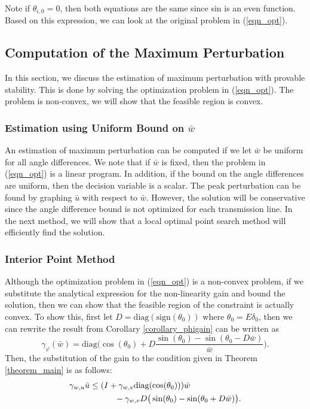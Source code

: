 \documentclass[journal]{IEEEtran}
\theoremstyle{definition}
\begin{document}
Note if $\theta_{i,0}=0$, then both equations are the same since sin is an even function. Based on this expression, we can look at the original problem in (\ref{eqn_opt}).

\subsection{Computation of the Maximum Perturbation}
In this section, we discuss the estimation of maximum perturbation with provable stability. This is done by solving the optimization problem in (\ref{eqn_opt}). The problem is non-convex, we will show that the feasible region is convex.


\subsubsection{Estimation using Uniform Bound on $\bar{w}$}
An estimation of maximum perturbation can be computed if we let $\bar{w}$ be uniform for all angle differences. We note that if $\bar{w}$ is fixed, then the problem in (\ref{eqn_opt}) is a linear program. In addition, if the bound on the angle differences are uniform, then the decision variable is a scalar. The peak perturbation can be found by graphing $\bar{u}$ with respect to $\bar{w}$. However, the solution will be conservative since the angle difference bound is not optimized for each transmission line. In the next method, we will show that a local optimal point search method will efficiently find the solution.

\subsubsection{Interior Point Method}
Although the optimization problem in (\ref{eqn_opt}) is a non-convex problem, if we substitute the analytical expression for the non-linearity gain and bound the solution, then we can show that the feasible region of the constraint is actually convex.
To show this, first let $D=\text{diag}(\text{sign}(\theta_0))$ where $\theta_0=E\delta_0$, then we can rewrite the result from Corollary \ref{corollary_phigain} can be written as
\begin{equation}
\gamma_\varphi(\bar{w})=\text{diag}\bigg(\cos(\theta_0)+D\frac{\sin(\theta_0)-\sin(\theta_0-D\bar{w})}{\bar{w}}\bigg).
\end{equation}
Then, the substitution of the gain to the condition given in Theorem \ref{theorem_main} is as follows:
\begin{equation}
\begin{aligned}
\gamma_{w,u}\bar{u}&\leq(I+\gamma_{w,v}\text{diag}(\cos(\theta_0)))\bar{w} \\
& \hskip 3em -\gamma_{w,v}D\big(\sin(\theta_0)-\sin(\theta_0+D\bar{w})\big).
\end{aligned}
\end{equation}
\end{document}
